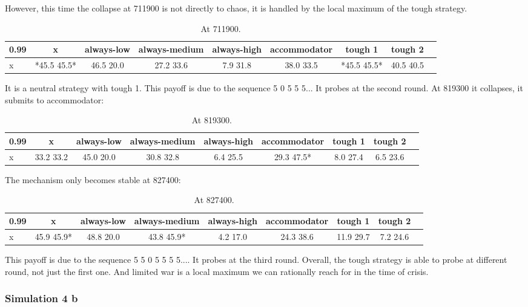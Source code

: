 \documentclass[12.5pt]{report}
\begin{document}
However, this time the collapse at 711900 is not directly to chaos, it is handled by the local maximum of the tough strategy.
\begin{table}[h!]
\center
\begin{tabular}{l|cccccccc}
\textbf{0.99}& x & always-low & always-medium & always-high & accommodator &tough 1 & tough 2\\
\hline
x&*45.5 45.5*   &  46.5 20.0   &   27.2 33.6 &     7.9 31.8   &    38.0 33.5   &  *45.5 45.5* &    40.5 40.5\\
\end{tabular}
\caption{At 711900.}
\end{table}

It is a neutral strategy with tough 1. This payoff is due to the sequence 5 0 5 5 5... It probes at the second round. At 819300 it collapses, it submits to accommodator:  
\begin{table}[h!]
\center
\begin{tabular}{l|cccccccc}
\textbf{0.99}& x & always-low & always-medium & always-high & accommodator &tough 1 & tough 2\\
\hline
x&33.2 33.2 &   45.0 20.0  &  30.8 32.8  &   6.4 25.5    & 29.3 47.5*&    8.0 27.4&     6.5 23.6 \\  
\end{tabular}
\caption{At 819300.}
\end{table}

The mechanism only becomes stable at 827400: 
\begin{table}[h!]
\center
\begin{tabular}{l|cccccccc}
\textbf{0.99}& x & always-low & always-medium & always-high & accommodator &tough 1 & tough 2\\
\hline
x&  45.9 45.9*&   48.8 20.0  &  43.8 45.9* &   4.2 17.0 &   24.3 38.6&    11.9 29.7 &    7.2 24.6\\  
\end{tabular}
\caption{At 827400.}
\end{table}

This payoff is due to the sequence 5 5 0 5 5 5 5.... It probes at the third round. Overall, the tough strategy is able to probe at different round, not just the first one. And limited war is a local maximum we can rationally reach for in the time of crisis.

\subsubsection{Simulation 4 b}
\end{document}
